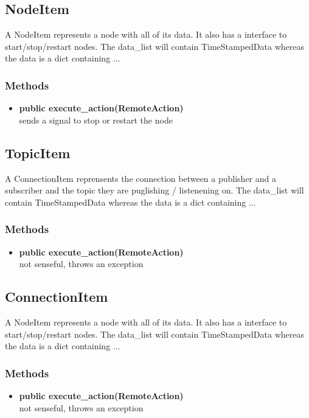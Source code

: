 \subsection{NodeItem}
 A NodeItem represents a node with all of its data. It also has a interface to start/stop/restart nodes.
 The data\_list will contain TimeStampedData whereas the data is a dict containing ...
\subsubsection{Methods}
\begin{itemize}
  \item \textbf{public execute\_action(RemoteAction)}\\
  sends a signal to stop or restart the node
\end{itemize}

\subsection{TopicItem}
A ConnectionItem reprensents the connection between a publisher and a subscriber and the topic they are puglishing / listenening on.
The data\_list will contain TimeStampedData whereas the data is a dict containing ...
\subsubsection{Methods}
\begin{itemize}
  \item \textbf{public execute\_action(RemoteAction)}\\ 
  not senseful, throws an exception
\end{itemize}

\subsection{ConnectionItem}
 A NodeItem represents a node with all of its data. It also has a interface to start/stop/restart nodes.
 The data\_list will contain TimeStampedData whereas the data is a dict containing ...
\subsubsection{Methods}
\begin{itemize}
  \item \textbf{public execute\_action(RemoteAction)}\\ 
  not senseful, throws an exception
\end{itemize}

